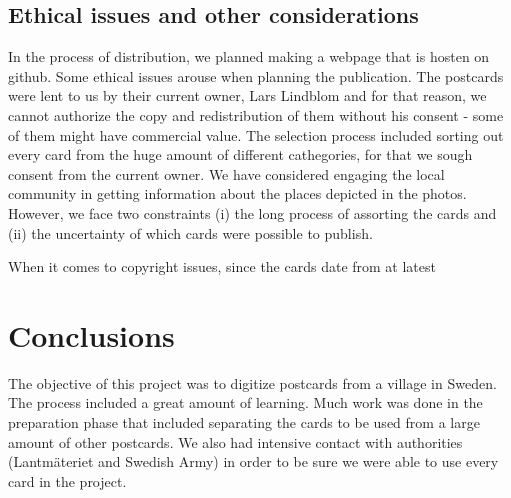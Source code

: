 \documentclass[12 pt]{paper}
\begin{document}
\subsection{Ethical issues and other considerations}

In the process of distribution, we planned making a webpage that is hosten on github. Some ethical issues \autocite[cf.][]{manzuch2017} arouse when planning the publication. The postcards were lent to us by their current owner, Lars Lindblom and for that reason, we cannot authorize the copy and redistribution of them without his consent - some of them might have commercial value. The selection process included sorting out every card from the huge amount of different cathegories, for that we sough consent from the  current owner. We have considered engaging the local community \autocite[cf.][]{hss2020, manzuch2017} in getting information about the places depicted in the photos. However, we face two constraints (i) the long process of assorting the cards and (ii) the uncertainty of which cards were possible to publish. 

When it comes to copyright issues, since the cards date from at latest

\section{Conclusions}
The objective of this project was to digitize postcards from a village in Sweden. The process included a great amount of learning. Much work was done in the preparation phase that included separating the cards to be used from a large amount of other postcards. We also had intensive contact with authorities (Lantmäteriet and Swedish Army) in order to be sure we were able to use every card in the project. 


\newpage

%
%
\printbibliography
\end{document}
